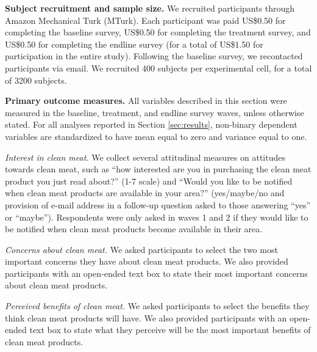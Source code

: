 \documentclass[12pt]{article}
\begin{document}
\textbf{Subject recruitment and sample size.} We recruited participants through Amazon Mechanical Turk (MTurk). Each participant was paid US\$0.50 for completing the baseline survey, US\$0.50 for completing the treatment survey, and US\$0.50 for completing the endline survey (for a total of US\$1.50 for participation in the entire study). Following the baseline survey, we recontacted participants via email. We recruited 400 subjects per experimental cell, for a total of 3200 subjects.



\textbf{Primary outcome measures.} All variables described in this section were measured in the baseline, treatment, and endline survey waves, unless otherwise stated. For all analyses reported in Section \ref{sec:results}, non-binary dependent variables are standardized to have mean equal to zero and variance equal to one.


\textit{Interest in clean meat.} We collect several attitudinal measures on attitudes towards clean meat, such as ``how interested are you in purchasing the clean meat product you just read about?'' (1-7 scale) and ``Would you like to be notified when clean meat products are available in your area?'' (yes/maybe/no and provision of e-mail address in a follow-up question asked to those answering ``yes'' or ``maybe''). Respondents were only asked in waves 1 and 2 if they would like to be notified when clean meat products become available in their area.

\textit{Concerns about clean meat.} We asked participants to select the two most important concerns they have about clean meat products. We also provided participants with an open-ended text box to state their most important concerns about clean meat products.

\textit{Perceived benefits of clean meat.} We asked participants to select the benefits they think clean meat products will have. We also provided participants with an open-ended text box to state what they perceive will be the most important benefits of clean meat products.
\end{document}
